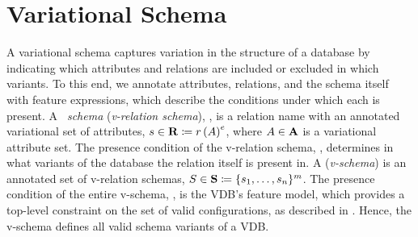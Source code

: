 \section{Variational Schema}
\label{sec:vsch}

%

A variational schema captures variation in the structure of a database by indicating which attributes and relations are included or excluded in which variants.
%
To this end, we annotate attributes, relations, and the schema itself with
feature expressions,
which describe the conditions under which each is present.
%
A \emph{\vrelTxt\ schema} (\emph{v-relation schema}), \vRelSch, is a relation name
with an annotated variational set of attributes,
$\synDef {\vRelSch} \vRelSchSet \eqq \vRelDef$,
where \ensuremath{\vAttList \in \vAttSet} is a variational attribute set.
The presence condition of the v-relation schema, \dimMeta, determines in what
variants of the database the relation itself is present in.
%
A \emph{\vschTxt} (\emph{v-schema}) is an annotated set of v-relation 
schemas,
$\synDef \vSch \vSchSet \eqq \vSchDef$.
The presence condition of the entire v-schema, \fModel, is the VDB's feature
model, which provides a top-level constraint on the set of valid
configurations, as described in .
Hence, the v-schema defines all valid schema variants of a VDB. 


